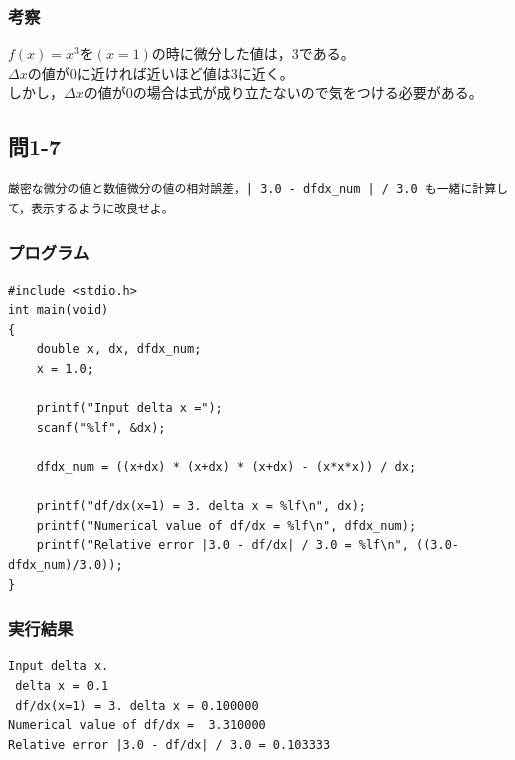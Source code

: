 \documentclass{jarticle}
\begin{document}
\subsubsection{考察\\}
$f(x) = x^3を(x=1)の時に微分した値は，3である。$\\
$\Delta {x}の値が0に近ければ近いほど値は3に近く。$\\
$しかし，\Delta {x}の値が0の場合は式が成り立たないので気をつける必要がある。$\\

\subsection{問1-7\\}
\begin{verbatim}
厳密な微分の値と数値微分の値の相対誤差，| 3.0 - dfdx_num | / 3.0 も一緒に計算して，表示するように改良せよ。
\end{verbatim}
\subsubsection{プログラム\\}
\begin{breakbox}
\begin{verbatim}
#include <stdio.h>
int main(void)
{
    double x, dx, dfdx_num;
    x = 1.0;
    
    printf("Input delta x =");
    scanf("%lf", &dx);
    
    dfdx_num = ((x+dx) * (x+dx) * (x+dx) - (x*x*x)) / dx;
    
    printf("df/dx(x=1) = 3. delta x = %lf\n", dx);
    printf("Numerical value of df/dx = %lf\n", dfdx_num);
    printf("Relative error |3.0 - df/dx| / 3.0 = %lf\n", ((3.0-dfdx_num)/3.0));
}
\end{verbatim}
\end{breakbox}
\subsubsection{実行結果\\}
\begin{breakbox}
\begin{verbatim}
Input delta x. 
 delta x = 0.1 
 df/dx(x=1) = 3. delta x = 0.100000 
Numerical value of df/dx =  3.310000 
Relative error |3.0 - df/dx| / 3.0 = 0.103333 
\end{verbatim}
\end{breakbox}
\end{document}
